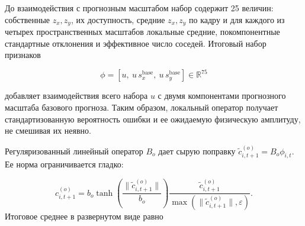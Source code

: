 \documentclass[11pt,a4paper]{article}
\begin{document}
До взаимодействия с прогнозным масштабом набор содержит 25 величин: собственные $z_x,z_y$, их доступность, средние $z_x,z_y$ по кадру и для каждого из четырех пространственных масштабов локальные средние, покомпонентные стандартные отклонения и эффективное число соседей. Итоговый набор признаков

\begin{equation}
\phi=[u,\ u\,s_x^{\mathrm{base}},\ u\,s_y^{\mathrm{base}}]\in\mathbb R^{75}
\end{equation}

добавляет взаимодействия всего набора $u$ с двумя компонентами прогнозного масштаба базового прогноза. Таким образом, локальный оператор получает стандартизованную вероятность ошибки и ее ожидаемую физическую амплитуду, не смешивая их неявно.

Регуляризованный линейный оператор $B_o$ дает сырую поправку $\widetilde c^{(o)}_{i,t+1}=B_o\phi_{i,t}$. Ее норма ограничивается гладко:

\begin{equation}
c^{(o)}_{i,t+1}=
b_o\tanh\left(\frac{\|\widetilde c^{(o)}_{i,t+1}\|}{b_o}\right)
\frac{\widetilde c^{(o)}_{i,t+1}}
{\max(\|\widetilde c^{(o)}_{i,t+1}\|,\varepsilon)}.
\end{equation}
Итоговое среднее в развернутом виде равно
\end{document}
